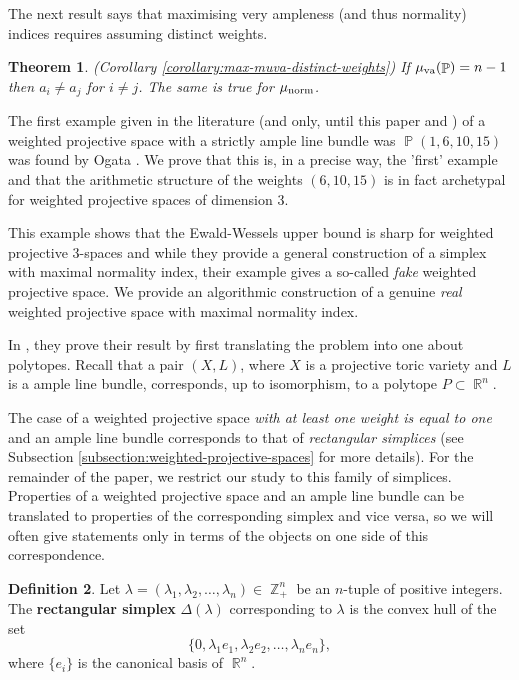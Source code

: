 \documentclass[a4paper,11pt]{amsart}
\theoremstyle{plain}
\newtheorem{theorem}{Theorem}[section]
\theoremstyle{definition}
\newtheorem{definition}[theorem]{Definition}
\theoremstyle{remark}
\DeclareMathOperator{\ZZ}{\mathbb{Z}}
\DeclareMathOperator{\RR}{\mathbb{R}}
\DeclareMathOperator{\PP}{\mathbb{P}}
\DeclareMathOperator{\munorm}{\mu_{\text norm}}
\DeclareMathOperator{\muva}{\mu_{\text va}}
\begin{document}
The next result says that maximising very ampleness (and thus normality) indices requires assuming distinct weights.
\begin{theorem}(Corollary \ref{corollary:max-muva-distinct-weights})
        If $\muva(\PP) = n-1$ then $a_i \neq a_j$ for $i \neq j$.
        The same is true for $\munorm$.
\end{theorem}

The first example given in the literature (and only, until this paper and \cite{MullerPaemurru:2025}) of a weighted projective space with a strictly ample line bundle was $\PP(1,6,10,15)$ was found by Ogata \cite{Ogata:2005}.
We prove that this is, in a precise way, the 'first' example and that the arithmetic structure of the weights $(6,10,15)$ is in fact archetypal for weighted projective spaces of dimension 3.

This example shows that the Ewald-Wessels upper bound is sharp for weighted projective 3-spaces and while they provide a general construction of a simplex with maximal normality index, their example gives a so-called \emph{fake} weighted projective space.
We provide an algorithmic construction of a genuine \emph{real} weighted projective space with maximal normality index.

In \cite{EwaldWessels:1991}, they prove their result by first translating the problem into one about polytopes.
Recall that a pair $(X,L)$, where $X$ is a projective toric variety and $L$ is a ample line bundle, corresponds, up to isomorphism, to a polytope $P \subset \RR^n$.

The case of a weighted projective space \emph{with at least one weight is equal to one} and an ample line bundle corresponds to that of \emph{rectangular simplices} (see Subsection \ref{subsection:weighted-projective-spaces} for more details). For the remainder of the paper, we restrict our study to this family of simplices. Properties of a weighted projective space and an ample line bundle can be translated to properties of the corresponding simplex and vice versa, so we will often give statements only in terms of the objects on one side of this correspondence.

\begin{definition}\label{definition:rectangular-simplex}
    Let $\lambda = (\lambda_1, \lambda_2, \ldots, \lambda_n) \in \ZZ_+^n$ be an $n$-tuple of positive integers. The \textbf{rectangular simplex} $\Delta(\lambda)$ corresponding to $\lambda$ is the convex hull of the set
    \[
    \{0, \lambda_1e_1, \lambda_2e_2, \ldots, \lambda_ne_n\},
    \]
    where $\{e_i\}$ is the canonical basis of $\RR^n$.
\end{definition}
\end{document}
